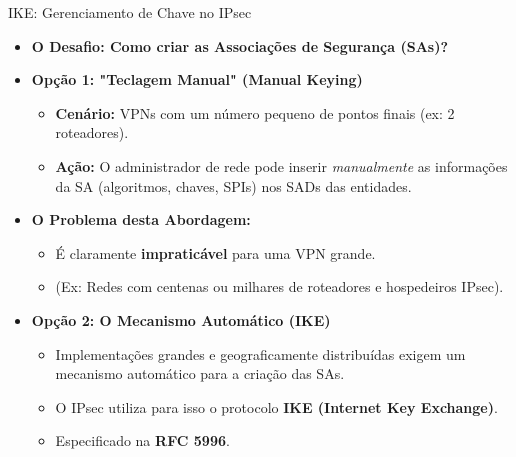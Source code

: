 \begin{frame}{IKE: Gerenciamento de Chave no IPsec}
    \begin{itemize}
        \item \textbf{O Desafio: Como criar as Associações de Segurança (SAs)?}

        \item \textbf{Opção 1: "Teclagem Manual" (Manual Keying)}
              \begin{itemize}
                  \item \textbf{Cenário:} VPNs com um número pequeno de pontos finais (ex: 2 roteadores).
                  \item \textbf{Ação:} O administrador de rede pode inserir \textit{manualmente} as informações da SA (algoritmos, chaves, SPIs) nos SADs das entidades.
              \end{itemize}

        \item \textbf{O Problema desta Abordagem:}
              \begin{itemize}
                  \item É claramente \textbf{impraticável} para uma VPN grande.
                  \item (Ex: Redes com centenas ou milhares de roteadores e hospedeiros IPsec).
              \end{itemize}

        \item \textbf{Opção 2: O Mecanismo Automático (IKE)}
              \begin{itemize}
                  \item Implementações grandes e geograficamente distribuídas exigem um mecanismo automático para a criação das SAs.
                  \item O IPsec utiliza para isso o protocolo \textbf{IKE (Internet Key Exchange)}.
                  \item Especificado na \textbf{RFC 5996}.
              \end{itemize}
    \end{itemize}
\end{frame}

